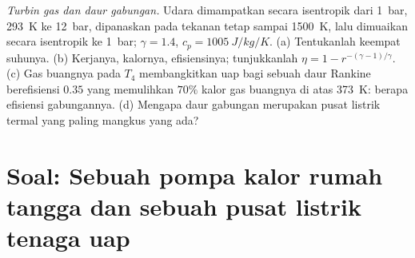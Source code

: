 \begin{exercise}[$\star\star\star$]\label{exo:b2:open-systems:12}
\emph{Turbin gas dan daur gabungan.} Udara dimampatkan secara isentropik
dari \qty{1}{bar}, \qty{293}{K} ke \qty{12}{bar}, dipanaskan pada tekanan tetap
sampai \qty{1500}{K}, lalu dimuaikan secara isentropik ke \qty{1}{bar}; $\gamma = 1.4$,
$c_p = \qty{1005}{J/kg/K}$. (a) Tentukanlah keempat suhunya. (b) Kerjanya,
kalornya, efisiensinya; tunjukkanlah $\eta = 1 - r^{-(\gamma - 1)/\gamma}$. (c) Gas
buangnya pada $T_4$ membangkitkan uap bagi sebuah daur Rankine berefisiensi $0.35$
yang memulihkan $70\%$ kalor gas buangnya di atas \qty{373}{K}: berapa efisiensi
gabungannya. (d) Mengapa daur gabungan merupakan pusat listrik termal yang paling
mangkus yang ada?
\end{exercise}

\section{Soal: Sebuah pompa kalor rumah tangga dan sebuah pusat listrik tenaga uap}

